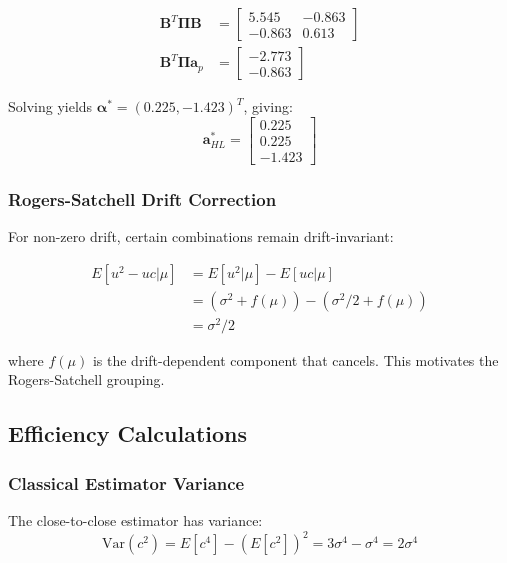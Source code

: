 \begin{align}
\mathbf{B}^T\boldsymbol{\Pi}\mathbf{B} &= \begin{bmatrix}
5.545 & -0.863 \\
-0.863 & 0.613
\end{bmatrix} \\
\mathbf{B}^T\boldsymbol{\Pi}\mathbf{a}_p &= \begin{bmatrix}
-2.773 \\
-0.863
\end{bmatrix}
\end{align}

Solving yields $\boldsymbol{\alpha}^* = (0.225, -1.423)^T$, giving:
\begin{equation}
\mathbf{a}_{HL}^* = \begin{bmatrix}
0.225 \\
0.225 \\
-1.423
\end{bmatrix}
\end{equation}

\subsubsection{ Rogers-Satchell Drift Correction}

For non-zero drift, certain combinations remain drift-invariant:

\begin{align}
E[u^2 - uc | \mu] &= E[u^2 | \mu] - E[uc | \mu] \\
&= (\sigma^2 + f(\mu)) - (\sigma^2/2 + f(\mu)) \\
&= \sigma^2/2
\end{align}

where $f(\mu)$ is the drift-dependent component that cancels. This motivates the Rogers-Satchell grouping.

\subsection{ Efficiency Calculations}

\subsubsection{ Classical Estimator Variance}

The close-to-close estimator has variance:
\begin{equation}
\text{Var}(c^2) = E[c^4] - (E[c^2])^2 = 3\sigma^4 - \sigma^4 = 2\sigma^4
\end{equation}

